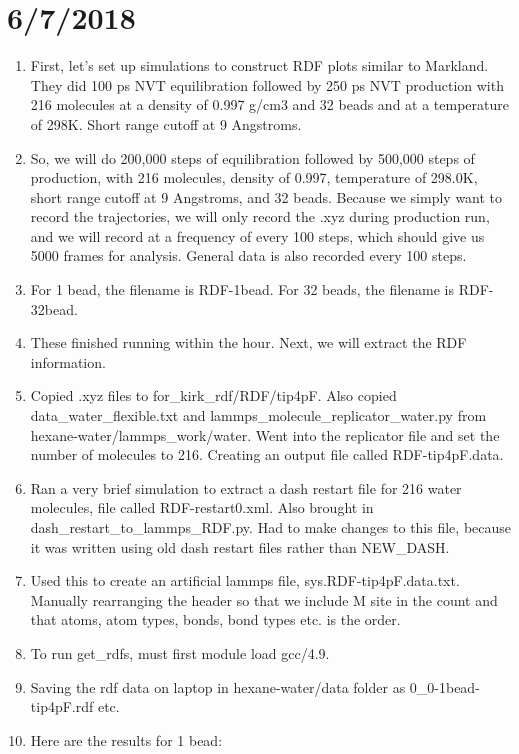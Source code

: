 \documentclass[12pt,reqno]{amsart}
\numberwithin{equation}{section}
\begin{document}
\section{6/7/2018}
\begin{enumerate}
\item First, let's set up simulations to construct RDF plots similar to Markland.  They did 100 ps NVT equilibration followed by 250 ps NVT production with 216 molecules at a density of 0.997 g/cm3 and 32 beads and at a temperature of 298K.  Short range cutoff at 9 Angstroms.  
\item So, we will do 200,000 steps of equilibration followed by 500,000 steps of production, with 216 molecules, density of 0.997, temperature of 298.0K, short range cutoff at 9 Angstroms, and 32 beads.  Because we simply want to record the trajectories, we will only record the .xyz during production run, and we will record at a frequency of every 100 steps, which should give us 5000 frames for analysis.  General data is also recorded every 100 steps.  
\item For 1 bead, the filename is RDF-1bead.  For 32 beads, the filename is RDF-32bead.  
\item These finished running within the hour.  Next, we will extract the RDF information.  
\item Copied .xyz files to for\_kirk\_rdf/RDF/tip4pF.  Also copied data\_water\_flexible.txt and lammps\_molecule\_replicator\_water.py from hexane-water/lammps\_work/water.  Went into the replicator file and set the number of molecules to 216.  Creating an output file called RDF-tip4pF.data.  
\item Ran a very brief simulation to extract a dash restart file for 216 water molecules, file called RDF-restart0.xml.  Also brought in dash\_restart\_to\_lammps\_RDF.py.  Had to make changes to this file, because it was written using old dash restart files rather than NEW\_DASH.    
\item Used this to create an artificial lammps file, sys.RDF-tip4pF.data.txt.  Manually rearranging the header so that we include M site in the count and that atoms, atom types, bonds, bond types etc. is the order.  
\item To run get\_rdfs, must first module load gcc/4.9.  
\item Saving the rdf data on laptop in hexane-water/data folder as 0\_0-1bead-tip4pF.rdf etc.  
\item Here are the results for 1 bead:


\end{enumerate}
\end{document}
